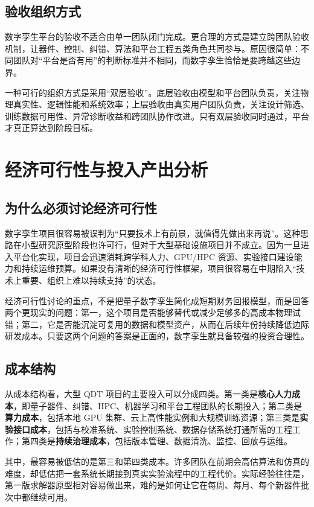 \documentclass[11pt,a4paper]{article}
\newcommand{\QDT}{QDT}
\begin{document}
\subsection{验收组织方式}

数字孪生平台的验收不适合由单一团队闭门完成。更合理的方式是建立跨团队验收机制，让器件、控制、纠错、算法和平台工程五类角色共同参与。原因很简单：不同团队对“平台是否有用”的判断标准并不相同，而数字孪生恰恰是要跨越这些边界。

一种可行的组织方式是采用“双层验收”。底层验收由模型和平台团队负责，关注物理真实性、逻辑性能和系统效率；上层验收由真实用户团队负责，关注设计筛选、训练数据可用性、异常诊断收益和跨团队协作改进。只有双层验收同时通过，平台才真正算达到阶段目标。

\section{经济可行性与投入产出分析}

\subsection{为什么必须讨论经济可行性}

数字孪生项目很容易被误判为“只要技术上有前景，就值得先做出来再说”。这种思路在小型研究原型阶段也许可行，但对于大型基础设施项目并不成立。因为一旦进入平台化实现，项目会迅速消耗跨学科人力、GPU/HPC 资源、实验接口建设能力和持续运维预算。如果没有清晰的经济可行性框架，项目很容易在中期陷入“技术上重要、组织上难以持续支持”的状态。

经济可行性讨论的重点，不是把量子数字孪生简化成短期财务回报模型，而是回答两个更现实的问题：第一，这个项目是否能够替代或减少足够多的高成本物理试错；第二，它是否能沉淀可复用的数据和模型资产，从而在后续年份持续降低边际研发成本。只要这两个问题的答案是正面的，数字孪生就具备较强的投资合理性。

\subsection{成本结构}

从成本结构看，大型 \QDT{} 项目的主要投入可以分成四类。第一类是\textbf{核心人力成本}，即量子器件、纠错、HPC、机器学习和平台工程团队的长期投入；第二类是\textbf{算力成本}，包括本地 GPU 集群、云上高性能实例和大规模训练资源；第三类是\textbf{实验接口成本}，包括与校准系统、实验控制系统、数据存储系统打通所需的工程工作；第四类是\textbf{持续治理成本}，包括版本管理、数据清洗、监控、回放与运维。

其中，最容易被低估的是第三和第四类成本。许多团队在前期会高估算法和仿真的难度，却低估把一套系统长期接到真实实验流程中的工程代价。实际经验往往是，第一版求解器原型相对容易做出来，难的是如何让它在每周、每月、每个新器件批次中都继续可用。
\end{document}
